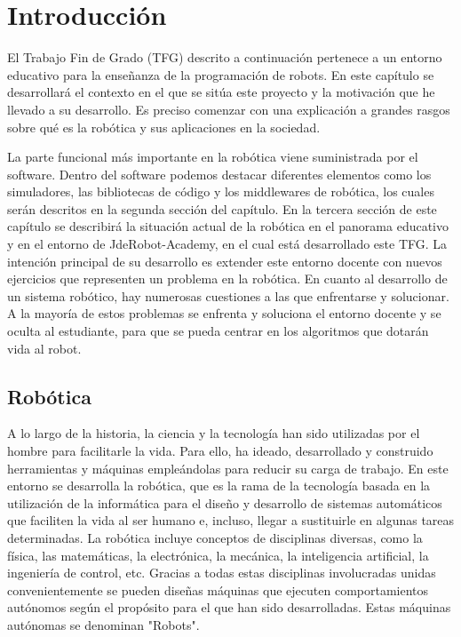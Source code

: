 \chapter{Introducción}\label{cap.introduccion}
El Trabajo Fin de Grado (TFG) descrito a continuación pertenece a un entorno educativo para la enseñanza de la programación de robots. En este capítulo se desarrollará el contexto en el que se sitúa este proyecto y la motivación que he llevado a su desarrollo. Es preciso comenzar con una explicación a grandes rasgos sobre qué es la robótica y sus aplicaciones en la sociedad.

La parte funcional más importante en la robótica viene suministrada por el software. Dentro del software podemos destacar diferentes elementos como los simuladores, las bibliotecas de código y los middlewares de robótica, los cuales serán descritos en la segunda sección del capítulo. En la tercera sección de este capítulo se describirá la situación actual de la robótica en el panorama educativo y en el entorno de JdeRobot-Academy, en el cual está desarrollado este TFG. La intención principal de su desarrollo es extender este entorno docente con nuevos ejercicios que representen un problema en la robótica. En cuanto al desarrollo de un sistema robótico, hay numerosas cuestiones a las que enfrentarse y solucionar. A la mayoría de estos problemas se enfrenta y soluciona el entorno docente y se oculta al estudiante, para que se pueda centrar en los algoritmos que dotarán vida al robot.

\section{Robótica}
A lo largo de la historia, la ciencia y la tecnología han sido utilizadas por el hombre para facilitarle la vida. Para ello, ha ideado, desarrollado y construido herramientas y máquinas empleándolas para reducir su carga de trabajo. En este entorno se desarrolla la robótica, que es la rama de la tecnología basada en la utilización de la informática para el diseño y desarrollo de sistemas automáticos que faciliten la vida al ser humano e, incluso, llegar a sustituirle en algunas tareas determinadas. La robótica incluye conceptos de disciplinas diversas, como la física, las matemáticas, la electrónica, la mecánica, la inteligencia artificial, la ingeniería de control, etc. Gracias a todas estas disciplinas involucradas unidas convenientemente se pueden diseñas máquinas que ejecuten comportamientos autónomos según el propósito para el que han sido desarrolladas. Estas máquinas autónomas se denominan "Robots".

